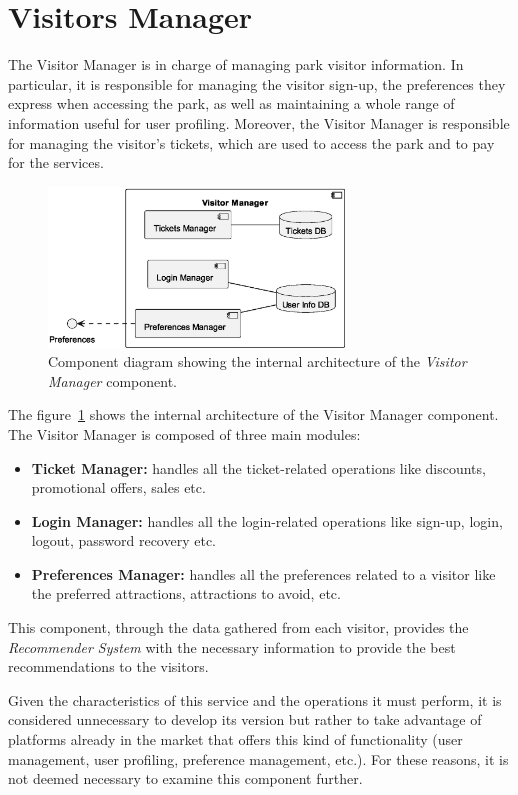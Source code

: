 \section{Visitors Manager}

The Visitor Manager is in charge of managing park visitor information. In particular, it is responsible for managing the visitor sign-up, the
preferences they express when accessing the park, as well as maintaining a whole range of information useful for user profiling.
Moreover, the Visitor Manager is responsible for managing the visitor's tickets, which are used to access the park and to pay for the services.

\begin{figure}[H]
	\centering
	\includegraphics[width=0.7\textwidth]{img/visitor-manager.eps}
	\caption{Component diagram showing the internal architecture of the \textit{Visitor Manager} component.
	}
	\label{fig:visitor-manager-arch}
\end{figure}

The figure~\ref{fig:visitor-manager-arch} shows the internal architecture of the Visitor Manager component. The Visitor Manager is composed of three main modules:

\begin{itemize}
	\item \textbf{Ticket Manager:} handles all the ticket-related operations like discounts, promotional offers, sales etc.
	\item \textbf{Login Manager:} handles all the login-related operations like sign-up, login, logout, password recovery etc.
	\item \textbf{Preferences Manager:} handles all the preferences related to a visitor like the preferred attractions, attractions to avoid, etc.
\end{itemize}

This component, through the data gathered from each visitor, provides the \textit{Recommender System} with the necessary information to provide the best recommendations to the visitors.

Given the characteristics of this service and the operations it must perform, it is considered unnecessary to develop its version but rather to
take advantage of platforms already in the market that offers this kind of functionality (user management, user profiling, preference management,
etc.). For these reasons, it is not deemed necessary to examine this component further.
